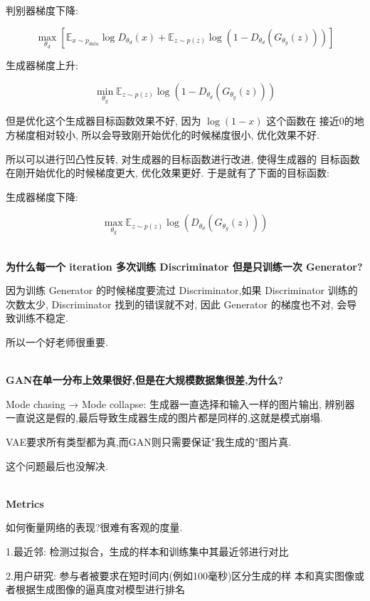 	判别器梯度下降:
	
	\begin{equation}
	\max_{\theta_d}\left[\mathbb{E}_{x\sim p_{data}}\log D_{\theta_d}(x)+\mathbb{E}_{z\sim p(z)}\log(1-D_{\theta_d}(G_{\theta_g}(z)))\right]
	\end{equation}

	生成器梯度上升:

	\begin{equation}
	\min_{\theta_g}\mathbb{E}_{z\sim p(z)}\log(1-D_{\theta_d}(G_{\theta_g}(z)))	
	\end{equation}

	但是优化这个生成器目标函数效果不好, 因为 $\log(1-x)$ 这个函数在
	接近0的地方梯度相对较小, 所以会导致刚开始优化的时候梯度很小, 优化效果不好.

	所以可以进行凹凸性反转, 对生成器的目标函数进行改进, 使得生成器的
	目标函数在刚开始优化的时候梯度更大, 优化效果更好. 于是就有了下面的目标函数:

	生成器梯度下降:

	\begin{equation}
	\max_{\theta_g}\mathbb{E}_{z\sim p(z)}\log(D_{\theta_d}(G_{\theta_g}(z)))
	\end{equation}

	\textbf{\\为什么每一个 iteration 多次训练 Discriminator 但是只训练一次 Generator?}

	因为训练 Generator 的时候梯度要流过 Discriminator,如果 Discriminator 训练的次数太少,
	Discriminator 找到的错误就不对, 因此 Generator 的梯度也不对, 会导致训练不稳定.

	所以一个好老师很重要.

	\textbf{\\GAN在单一分布上效果很好,但是在大规模数据集很差,为什么?}

	Mode chasing → Mode collapse: 生成器一直选择和输入一样的图片输出,
	辨别器一直说这是假的,最后导致生成器生成的图片都是同样的,这就是模式崩塌.

	VAE要求所有类型都为真,而GAN则只需要保证"我生成的"图片真.
	
	这个问题最后也没解决.

	\textbf{\\Metrics}

	如何衡量网络的表现?很难有客观的度量.
	
	1.最近邻: 检测过拟合，生成的样本和训练集中其最近邻进行对比

	2.用户研究: 参与者被要求在短时间内(例如100毫秒)区分生成的样
	本和真实图像或者根据生成图像的逼真度对模型进行排名 

